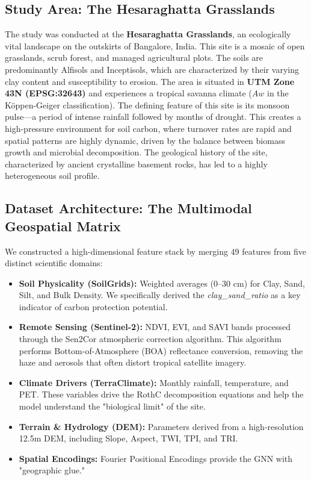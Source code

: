 \documentclass[conference]{IEEEtran}
\begin{document}
\subsection{Study Area: The Hesaraghatta Grasslands}
The study was conducted at the \textbf{Hesaraghatta Grasslands}, an ecologically vital landscape on the outskirts of Bangalore, India. This site is a mosaic of open grasslands, scrub forest, and managed agricultural plots. The soils are predominantly Alfisols and Inceptisols, which are characterized by their varying clay content and susceptibility to erosion. The area is situated in \textbf{UTM Zone 43N (EPSG:32643)} and experiences a tropical savanna climate ($Aw$ in the Köppen-Geiger classification). The defining feature of this site is its monsoon pulse—a period of intense rainfall followed by months of drought. This creates a high-pressure environment for soil carbon, where turnover rates are rapid and spatial patterns are highly dynamic, driven by the balance between biomass growth and microbial decomposition. The geological history of the site, characterized by ancient crystalline basement rocks, has led to a highly heterogeneous soil profile.

\subsection{Dataset Architecture: The Multimodal Geospatial Matrix}
We constructed a high-dimensional feature stack by merging 49 features from five distinct scientific domains:
\begin{itemize}
    \item \textbf{Soil Physicality (SoilGrids):} Weighted averages (0--30 cm) for Clay, Sand, Silt, and Bulk Density. We specifically derived the \textit{clay\_sand\_ratio} as a key indicator of carbon protection potential.
    \item \textbf{Remote Sensing (Sentinel-2):} NDVI, EVI, and SAVI bands processed through the Sen2Cor atmospheric correction algorithm. This algorithm performs Bottom-of-Atmosphere (BOA) reflectance conversion, removing the haze and aerosols that often distort tropical satellite imagery.
    \item \textbf{Climate Drivers (TerraClimate):} Monthly rainfall, temperature, and PET. These variables drive the RothC decomposition equations and help the model understand the "biological limit" of the site.
    \item \textbf{Terrain \& Hydrology (DEM):} Parameters derived from a high-resolution 12.5m DEM, including Slope, Aspect, TWI, TPI, and TRI.
    \item \textbf{Spatial Encodings:} Fourier Positional Encodings provide the GNN with "geographic glue."
\end{itemize}
\end{document}
